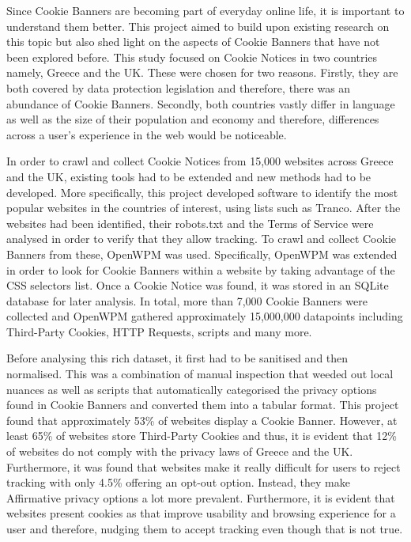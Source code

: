 \documentclass[../main.tex]{subfiles}
\begin{document}
Since Cookie Banners are becoming part of everyday online life, it is important to understand them better. This project aimed to build upon existing research on this topic but also shed light on the aspects of Cookie Banners that have not been explored before. This study focused on Cookie Notices in two countries namely, Greece and the UK. These were chosen for two reasons. Firstly, they are both covered by data protection legislation and therefore, there was an abundance of Cookie Banners. Secondly, both countries vastly differ in language as well as the size of their population and economy and therefore, differences across a user’s experience in the web would be noticeable.

In order to crawl and collect Cookie Notices from 15,000 websites across Greece and the UK, existing tools had to be extended and new methods had to be developed. More specifically, this project developed software to identify the most popular websites in the countries of interest, using lists such as Tranco. After the websites had been identified, their robots.txt and the Terms of Service were analysed in order to verify that they allow tracking. To crawl and collect Cookie Banners from these, OpenWPM was used. Specifically, OpenWPM was extended in order to look for Cookie Banners within a website by taking advantage of the  CSS selectors list. Once a Cookie Notice was found, it was stored in an SQLite database for later analysis. In total, more than 7,000 Cookie Banners were collected and OpenWPM gathered approximately 15,000,000 datapoints including Third-Party Cookies, HTTP Requests, scripts and many more. 

Before analysing this rich dataset, it first had to be sanitised and then normalised. This was a combination of manual inspection that weeded out local nuances as well as scripts that automatically categorised the privacy options found in Cookie Banners and converted them into a tabular format. This project found that approximately 53\% of websites display a Cookie Banner. However, at least 65\% of websites store Third-Party Cookies and thus, it is evident that 12\% of websites do not comply with the privacy laws of Greece and the UK. Furthermore, it was found that websites make it really difficult for users to reject tracking with only 4.5\% offering an opt-out option. Instead, they make Affirmative privacy options a lot more prevalent. Furthermore, it is evident that websites present cookies as  that improve usability and browsing experience for a user and therefore, nudging them to accept tracking even though that is not true. 
\end{document}
